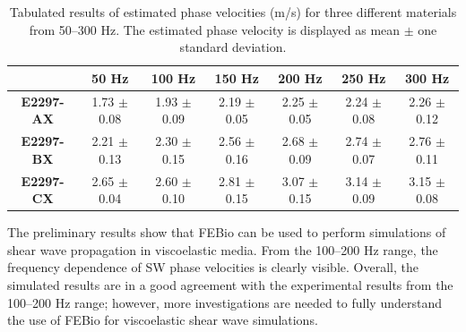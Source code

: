 \begin{table}
    \caption{Tabulated results of estimated phase velocities (m/s) for three
        different materials from 50--300 Hz. The estimated phase velocity is
        displayed as mean $\pm$ one standard deviation.}
    \label{table:febio_results}
    \begin{tabular}{|c|c|c|c|c|c|c|}
        \hline
         & \textbf{50 Hz} & \textbf{100 Hz} & \textbf{150 Hz} & \textbf{200 Hz} & \textbf{250 Hz} & \textbf{300 Hz} \\
         \hline
         \textbf{E2297-AX} & 1.73 $\pm$ 0.08 & 1.93 $\pm$ 0.09 & 2.19 $\pm$ 0.05 & 2.25 $\pm$ 0.05 & 2.24 $\pm$ 0.08 & 2.26 $\pm$ 0.12 \\
         \textbf{E2297-BX} & 2.21 $\pm$ 0.13 & 2.30 $\pm$ 0.15 & 2.56 $\pm$ 0.16 & 2.68 $\pm$ 0.09 & 2.74 $\pm$ 0.07 & 2.76 $\pm$ 0.11 \\
         \textbf{E2297-CX} & 2.65 $\pm$ 0.04 & 2.60 $\pm$ 0.10 & 2.81 $\pm$ 0.15 & 3.07 $\pm$ 0.15 & 3.14 $\pm$ 0.09 & 3.15 $\pm$ 0.08 \\
        \hline
    \end{tabular}
\end{table}

The preliminary results show that FEBio can be used to perform simulations of
shear wave propagation in viscoelastic media. From the 100--200 Hz range, the
frequency dependence of SW phase velocities is clearly visible. Overall, the
simulated results are in a good agreement with the experimental results from
the 100--200 Hz range; however, more investigations are needed to fully
understand the use of FEBio for viscoelastic shear wave simulations.
